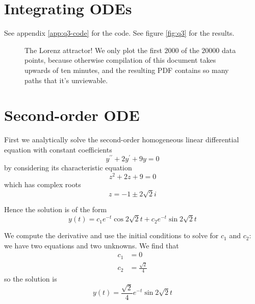 \documentclass[11pt,letterpaper]{article}
\begin{document}
\section{Integrating ODEs}

See appendix \ref{app:q3-code} for the code.
See figure \ref{fig:q3} for the results.

\begin{figure}
  \centering
  \caption{%
    The Lorenz attractor! We only plot the first $2000$ of the $20000$ data
    points, because otherwise compilation of this document takes upwards of ten
    minutes, and the resulting PDF contains so many paths that it's unviewable.
  }
\end{figure}

\section{Second-order ODE}

First we analytically solve the second-order homogeneous linear differential
equation with constant coefficients
%
\begin{equation*}
  y^{\prime\prime} + 2 y^\prime + 9 y = 0
\end{equation*}
%
by considering its characteristic equation
%
\begin{equation*}
  z^2 + 2z + 9 = 0
\end{equation*}
%
which has complex roots
%
\begin{equation*}
  z = -1 \pm 2 \sqrt 2 i
\end{equation*}

Hence the solution is of the form
%
\begin{equation*}
  y(t) = c_1 e^{-t} \cos{2\sqrt{2} t} + c_2 e^{-t} \sin{2\sqrt{2} t}
\end{equation*}

We compute the derivative and use the initial conditions to solve for $c_1$ and
$c_2$: we have two equations and two unknowns.
We find that
%
\begin{align*}
  c_1 &= 0 \\
  c_2 &= \frac{\sqrt{2}}{4}
\end{align*}
%
so the solution is
%
\begin{equation*}
  y(t) = \frac{\sqrt{2}}{4} e^{-t} \sin{2 \sqrt 2 t}
\end{equation*}
\end{document}
